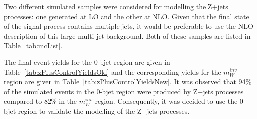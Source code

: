 Two different simulated samples were considered for modelling the Z+jets processes: one generated at LO and the other at NLO.
Given that the final state of the signal process contains multiple jets, it would be preferable to use the NLO description of this large multi-jet background.
Both of these samples are listed in Table~\ref{tab:mcList}.

The final event yields for the 0-bjet region are given in Table~\ref{tab:zPlusControlYieldsOld} and the corresponding yields for the $m_{W}^{inv}$ region are given in Table~\ref{tab:zPlusControlYieldsNew}.
It was observed that 94\% of the simulated events in the 0-bjet region were produced by Z+jets processes compared to 82\% in the $m_{W}^{inv}$ region.
Consequently, it was decided to use the 0-bjet region to validate the modelling of the Z+jets processes.

